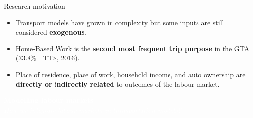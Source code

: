 \documentclass[aspectratio=169, xcolor=dvipsnames]{beamer}
\begin{document}
\begin{frame}{Research motivation}
    \begin{itemize}
        \setlength{\itemsep}{10pt}
        \item Transport models have grown in complexity but some inputs are still considered \textbf{exogenous}.
        \item Home-Based Work is the \textbf{second most frequent trip purpose} in the GTA (33.8\% - TTS, 2016).   
        \item Place of residence, place of work, household income, and auto ownership are \textbf{directly or indirectly related} to outcomes of the labour market.
    \end{itemize}
\end{frame}

{
\begin{frame}
    \begin{center}
        \textcolor{white}{{\fontsize{22pt}{14pt}\selectfont \textbf{Modelling labour markets}}}\\
        \vspace{20pt}
        \textcolor{white}{{\fontsize{14pt}{10pt}\selectfont \textsl{How we integrate labour markets in transportation models?}}}
    \end{center}
\end{frame}
}
\end{document}
